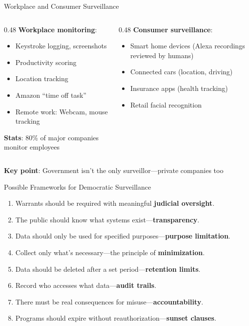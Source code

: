 ﻿\documentclass[aspectratio=169,11pt]{beamer}
\begin{document}
\begin{frame}{Workplace and Consumer Surveillance}
\begin{columns}[T]
\begin{column}{0.48\textwidth}
\textbf{Workplace monitoring}:
\begin{itemize}
    \item Keystroke logging, screenshots
    \item Productivity scoring
    \item Location tracking
    \item Amazon ``time off task''
    \item Remote work: Webcam, mouse tracking
\end{itemize}

\textbf{Stats}: 80\% of major companies monitor employees
\end{column}
\begin{column}{0.48\textwidth}
\textbf{Consumer surveillance}:
\begin{itemize}
    \item Smart home devices (Alexa recordings reviewed by humans)
    \item Connected cars (location, driving)
    \item Insurance apps (health tracking)
    \item Retail facial recognition
\end{itemize}
\end{column}
\end{columns}

\vspace{0.3em}
\textbf{Key point}: Government isn't the only surveillor---private companies too
\end{frame}

\begin{frame}{Possible Frameworks for Democratic Surveillance}
\begin{conceptbox}
\small
\begin{enumerate}
    \item Warrants should be required with meaningful \textbf{judicial oversight}.
    \item The public should know what systems exist---\textbf{transparency}.
    \item Data should only be used for specified purposes---\textbf{purpose limitation}.
    \item Collect only what's necessary---the principle of \textbf{minimization}.
    \item Data should be deleted after a set period---\textbf{retention limits}.
    \item Record who accesses what data---\textbf{audit trails}.
    \item There must be real consequences for misuse---\textbf{accountability}.
    \item Programs should expire without reauthorization---\textbf{sunset clauses}.
\end{enumerate}
\end{conceptbox}
\end{frame}
\end{document}
